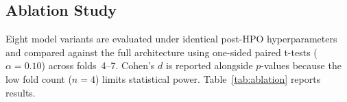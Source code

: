 \documentclass[journal]{IEEEtran}
\begin{document}
\begin{table}[!t]
\renewcommand{\arraystretch}{1.25}
\caption{Per-Fold IC Breakdown (S\&P~100)}
\label{tab:perfoldc}
\centering
{}
\end{table}

\subsection{Ablation Study}
\label{sec:ablation}

Eight model variants are evaluated under identical post-HPO
hyperparameters and compared against the full architecture using
one-sided paired t-tests ($\alpha=0.10$) across folds~4--7. Cohen's
$d$ is reported alongside $p$-values because the low fold count ($n=4$)
limits statistical power. Table~\ref{tab:ablation} reports results.
\end{document}
